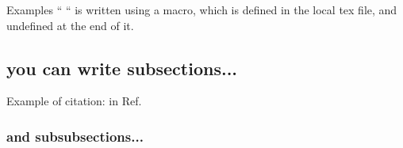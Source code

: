 Examples `` \Herwig{} `` is written using a macro, which is defined
in the local tex file, and undefined at the end of it.

\subsection{you can write subsections...}
Example of citation: in Ref.~\cite{Belanger:2014vza}

\subsubsection{and subsubsections...}

\let\Herwig\undefined
\let\Pythia\undefined
\let\Sherpa\undefined
\let\Rivet\undefined
\let\Professor\undefined
\let\eps\undefined
\let\mc\undefined
\let\mr\undefined
\let\mb\undefined
\let\tm\undefined




